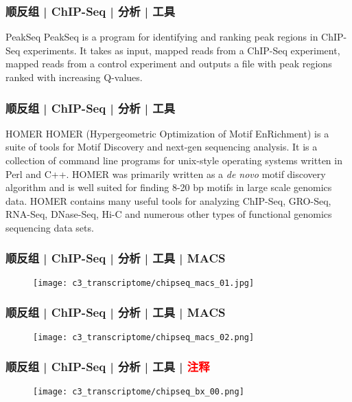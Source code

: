 \begin{frame}
  \frametitle{顺反组 | ChIP-Seq | 分析 | 工具}
  \begin{block}{PeakSeq}
    PeakSeq is a program for identifying and ranking peak regions in ChIP-Seq experiments. It takes as input, mapped reads from a ChIP-Seq experiment, mapped reads from a control experiment and outputs a file with peak regions ranked with increasing Q-values. 
  \end{block}
\end{frame}

\begin{frame}
  \frametitle{顺反组 | ChIP-Seq | 分析 | 工具}
  \begin{block}{HOMER}
    HOMER (Hypergeometric Optimization of Motif EnRichment) is a suite of tools for Motif Discovery and next-gen sequencing analysis.  It is a collection of command line programs for unix-style operating systems written in Perl and C++. HOMER was primarily written as a \textit{de novo} motif discovery algorithm and is well suited for finding 8-20 bp motifs in large scale genomics data.  HOMER contains many useful tools for analyzing ChIP-Seq, GRO-Seq, RNA-Seq, DNase-Seq, Hi-C and numerous other types of functional genomics sequencing data sets.
  \end{block}
\end{frame}

\begin{frame}
  \frametitle{顺反组 | ChIP-Seq | 分析 | 工具 | MACS}
  \begin{figure}
    \centering
    \texttt{[image: c3\_transcriptome/chipseq\_macs\_01.jpg]}
  \end{figure}
\end{frame}

\begin{frame}
  \frametitle{顺反组 | ChIP-Seq | 分析 | 工具 | MACS}
  \begin{figure}
    \centering
    \texttt{[image: c3\_transcriptome/chipseq\_macs\_02.png]}
  \end{figure}
\end{frame}

\begin{frame}
  \frametitle{顺反组 | ChIP-Seq | 分析 | 工具 | \textcolor{red}{注释}}
  \begin{figure}
    \centering
    \texttt{[image: c3\_transcriptome/chipseq\_bx\_00.png]}
  \end{figure}
\end{frame}

